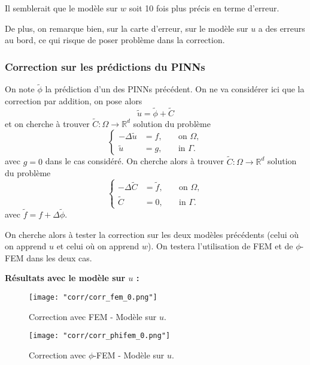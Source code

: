 \begin{Rem}
	Il semblerait que le modèle sur $w$ soit 10 fois plus précis en terme d'erreur.
	
	De plus, on remarque bien, sur la carte d'erreur, sur le modèle sur $u$ a des erreurs au bord, ce qui risque de poser problème dans la correction. 
\end{Rem}

\subsubsection{Correction sur les prédictions du PINNs}

On note $\tilde{\phi}$ la prédiction d'un des PINNs précédent. On ne va considérer ici que la correction par addition, on pose alors
\begin{equation*}
	\tilde{u}=\tilde{\phi}+\tilde{C}
\end{equation*}
et on cherche à trouver $\tilde{C}: \Omega \rightarrow \mathbb{R}^d$ solution du problème
\begin{equation*}
	\left\{\begin{aligned}
		-\Delta \tilde{u}&=f, \; &&\text{on } \Omega, \\
		\tilde{u}&=g, \; &&\text{in } \Gamma.
	\end{aligned}\right.
\end{equation*}
avec $g=0$ dans le cas considéré.
On cherche alors à trouver $\tilde{C}: \Omega \rightarrow \mathbb{R}^d$ solution du problème
\begin{equation*}
	\left\{\begin{aligned}
		-\Delta \tilde{C}&=\tilde{f}, \; &&\text{on } \Omega, \\
		\tilde{C}&=0, \; &&\text{in } \Gamma.
	\end{aligned}\right. %
\end{equation*}
avec $\tilde{f}=f+\Delta\tilde{\phi}$.

On cherche alors à tester la correction sur les deux modèles précédents (celui où on apprend $u$ et celui où on apprend $w$). On testera l'utilisation de FEM et de $\phi$-FEM dans les deux cas.

\textbf{Résultats avec le modèle sur $u$ :}

\begin{minipage}{0.48\linewidth}
	\begin{figure}[H]
		\centering
		\texttt{[image: "corr/corr\_fem\_0.png"]}
		\caption{Correction avec FEM - Modèle sur $u$.}
		\label{corr_fem_0}
	\end{figure}
\end{minipage}
\begin{minipage}{0.48\linewidth}
	\begin{figure}[H]
		\centering
		\texttt{[image: "corr/corr\_phifem\_0.png"]}
		\caption{Correction avec $\phi$-FEM - Modèle sur $u$.}
		\label{corr_phifem_0}
	\end{figure}
\end{minipage}

